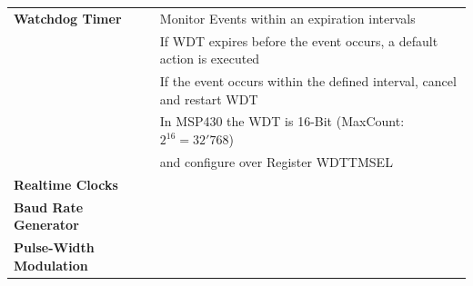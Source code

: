 \begin{tabular}{l l}
	\textbf{Watchdog Timer} & Monitor Events within an expiration intervals\\
	& If WDT expires before the event occurs, a default action is executed\\
	& If the event occurs within the defined interval, cancel and restart WDT\\
	& In MSP430 the WDT is 16-Bit (MaxCount: $2^{16}=32'768$) \\
	& and configure over Register WDTTMSEL\\
	\textbf{Realtime Clocks} &\\
	\textbf{Baud Rate Generator} & \\
	\textbf{Pulse-Width Modulation} & \\
	
\end{tabular}
\clearpage
\pagebreak